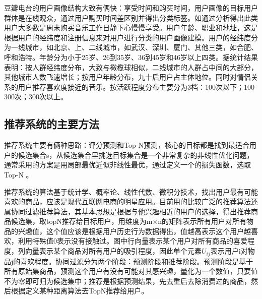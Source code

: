 		豆瓣电台的用户画像结构大致有俩快：享受时间和购买时间，用户画像的目标用户群体是在线观众，通过用户购买时间差区别并得出分类标签。如通过分析得出此类用户大多数是周末购买音乐工作日静下心慢慢享受。用户年龄、职业和地址，这是根据用户的经纬度和注册信息来对用户进行分类的用户画像建模。用户的经纬度分为一线城市，如北京、上、二线城市，如武汉、深圳、厦门、其他三类，如合肥、呼和浩特。年龄分为小于25岁、26到35岁、36到45岁和46岁以上四类。据统计结果表明：按人群经纬度分布，大致与橄榄球相似，二线城市的人群占中间的大部分，其他城市人数飞速增长；按用户年龄分布，九十后用户占主体地位。同时对情侣关系的用户推荐喜欢度接近的音乐。按活跃程度分布主要分为3档：100次以下；100-300次；300次以上。
		\begin{figure}
	    \centering
	      \label{pic:recmd_doubanFM}
	    \end{figure}

		\subsection{推荐系统的主要方法}
		推荐系统主要有俩种思路：评分预测和Top-N预测，核心的目标都是找到最适合用户的候选集合s，从候选集合里挑选目标集合是一个非常复杂的非线性优化问题，通常采用的方案是用局部最优近似非线性最优，通过定义一个的损失函数，选取Top-N	\citep{recmd-Next}。

		推荐系统的算法基于统计学、概率论、线性代数、微积分技术，找出用户最有可能喜欢的商品，应该是现代互联网电商的明星应用。目前用的比较广泛的推荐算法还属协同过滤推荐算法，其基本思想是根据与他兴趣相近的用户的选择，得出推荐商品候选集，取topN推荐给目标用户，用维度为m×n的矩阵表示所有用户对所有物品的兴趣值，这个值应该是根据用户历史行为数据得出，值越高表示这个用户越喜欢，利用特殊值0表示没有接触过。图中行向量表示某个用户对所有商品的喜爱程度，列向量表示某个商品对所有用户的吸引程度，因此单个元素$U_{ij}$表示用户i对物品j的喜欢程度。协同过滤分为两个阶段：预测阶段和推荐阶段。预测阶段是基于所有原始集商品，预测这个用户有没有可能对其感兴趣，量化为一个数值，只要值不为零即可归为候选集中；推荐是根据预测结果，先去重后去除消费过的商品，然后根据定义某种距离算法\citep{Wikipedia}去TopN推荐给用户。

